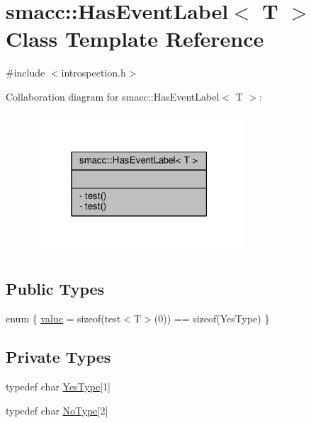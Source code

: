 \hypertarget{classsmacc_1_1HasEventLabel}{}\section{smacc\+:\+:Has\+Event\+Label$<$ T $>$ Class Template Reference}
\label{classsmacc_1_1HasEventLabel}


{\ttfamily \#include $<$introspection.\+h$>$}



Collaboration diagram for smacc\+:\+:Has\+Event\+Label$<$ T $>$\+:
\nopagebreak
\begin{figure}[H]
\begin{center}
\leavevmode
\includegraphics[width=223pt]{classsmacc_1_1HasEventLabel__coll__graph}
\end{center}
\end{figure}
\subsection*{Public Types}
\begin{DoxyCompactItemize}
\item 
enum \{ \hyperlink{classsmacc_1_1HasEventLabel_a7aa204bcf7a7faf203081f1eaf577bf5afb831cdba5590b0dd7a722637b8a1125}{value} = sizeof(test$<$T$>$(0)) == sizeof(Yes\+Type)
 \}
\end{DoxyCompactItemize}
\subsection*{Private Types}
\begin{DoxyCompactItemize}
\item 
typedef char \hyperlink{classsmacc_1_1HasEventLabel_a7baf4f99540d64553d8bba388b77fb25}{Yes\+Type}\mbox{[}1\mbox{]}
\item 
typedef char \hyperlink{classsmacc_1_1HasEventLabel_a95929e58f14e06acf98ddcb5dec21f6b}{No\+Type}\mbox{[}2\mbox{]}
\end{DoxyCompactItemize}

